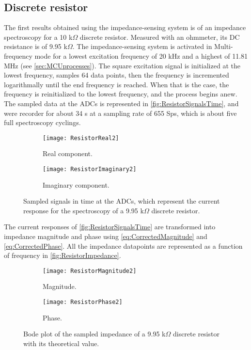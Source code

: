 \subsection{Discrete resistor}
The first results obtained using the impedance-sensing system is of an impedance spectroscopy for a 10 k$\Omega$ discrete resistor. Measured with an ohmmeter, its DC resistance is of 9.95 k$\Omega$. The impedance-sensing system is activated in Multi-frequency mode for a lowest excitation frequency of 20 kHz and a highest of 11.81 MHz (see \autoref{sec:MCUprocesses}). The square excitation signal is initialized at the lowest frequency, samples 64 data points, then the frequency is incremented logarithmally until the end frequency is reached. When that is the case, the frequency is reinitialized to the lowest frequency, and the process begins anew. The sampled data at the ADCs is represented in \autoref{fig:ResistorSignalsTime}, and were recorder for about 34 s at a sampling rate of 655 Sps, which is about five full spectroscopy cyclings. \par
\begin{figure}[h]
\centering
\begin{subfigure}{0.99\textwidth}
\centering
    \texttt{[image: ResistorReal2]}
    \caption{Real component.}
    \label{fig:ResistorReal2}
\end{subfigure}
\begin{subfigure}{0.99\textwidth}
\centering
    \texttt{[image: ResistorImaginary2]}
    \caption{Imaginary component.}
    \label{fig:ResistorImaginary2}
\end{subfigure}
\caption{Sampled signals in time at the ADCs, which represent the current response for the spectroscopy of a 9.95 k$\Omega$ discrete resistor.}
\label{fig:ResistorSignalsTime}
\end{figure}

The current responses of \autoref{fig:ResistorSignalsTime} are transformed into impedance magnitude and phase using \autoref{eq:CorrectedMagnitude} and \autoref{eq:CorrectedPhase}. All the impedance datapoints are represented as a function of frequency in \autoref{fig:ResistorImpedance}. \par
\begin{figure}[h]
\centering
\begin{subfigure}{0.99\textwidth}
\centering
    \texttt{[image: ResistorMagnitude2]}
    \caption{Magnitude.}
    \label{fig:ResistorMagnitude2}
\end{subfigure}
\begin{subfigure}{0.99\textwidth}
\centering
    \texttt{[image: ResistorPhase2]}
    \caption{Phase.}
    \label{fig:ResistorPhase2}
\end{subfigure}
\caption{Bode plot of the sampled impedance of a 9.95 k$\Omega$ discrete resistor with its theoretical value.}
\label{fig:ResistorImpedance}
\end{figure}

